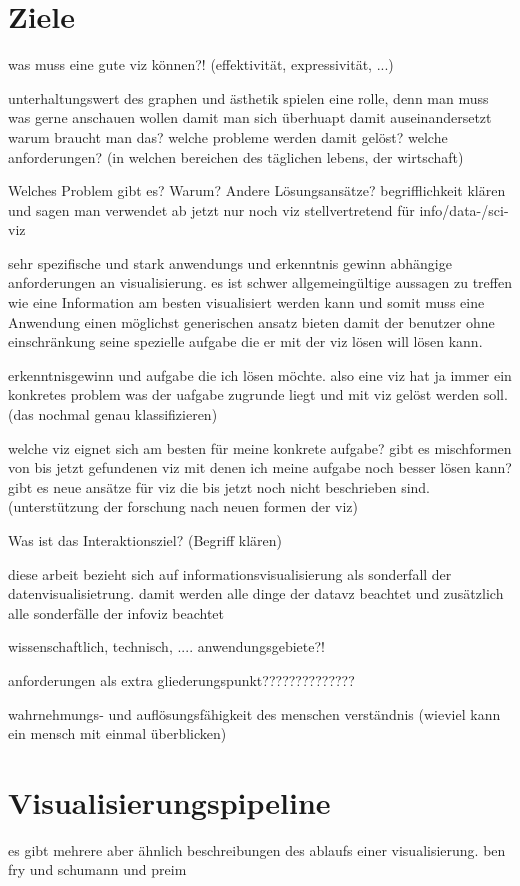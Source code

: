 \documentclass[a4paper, 12pt, DIVcalc, onepage, pdftex, headsepline, footsepline]{scrreprt}
\begin{document}
\section{Ziele}
\label{sec:Ziele}
was muss eine gute viz können?! (effektivität, expressivität, ...)

unterhaltungswert des graphen und ästhetik spielen eine rolle, denn man muss was gerne anschauen wollen damit man sich überhuapt damit auseinandersetzt
warum braucht man das? welche probleme werden damit gelöst?
welche anforderungen? (in welchen bereichen des täglichen lebens, der wirtschaft)

Welches Problem gibt es?
Warum?
Andere Lösungsansätze?
begrifflichkeit klären und sagen man verwendet ab jetzt nur noch viz stellvertretend für info/data-/sci-viz

sehr spezifische und stark anwendungs und erkenntnis gewinn abhängige anforderungen an visualisierung. 
es ist schwer allgemeingültige aussagen zu treffen wie eine Information am besten visualisiert werden kann und somit muss eine Anwendung einen möglichst generischen ansatz bieten damit der benutzer ohne einschränkung seine spezielle aufgabe die er mit der viz lösen will lösen kann.

erkenntnisgewinn und aufgabe die ich lösen möchte. also eine viz hat ja immer ein konkretes problem was der uafgabe zugrunde liegt und mit viz gelöst werden soll. (das nochmal genau klassifizieren)

welche viz eignet sich am besten für meine konkrete aufgabe?
gibt es mischformen von bis jetzt gefundenen viz mit denen ich meine aufgabe noch besser lösen kann?
gibt es neue ansätze für viz die bis jetzt noch nicht beschrieben sind. (unterstützung der forschung nach neuen formen der viz)

Was ist das Interaktionsziel? (Begriff klären)

diese arbeit bezieht sich auf informationsvisualisierung als sonderfall der datenvisualisietrung. damit werden alle dinge der datavz beachtet und zusätzlich alle sonderfälle der infoviz beachtet

wissenschaftlich, technisch, .... anwendungsgebiete?!

anforderungen als extra gliederungspunkt??????????????

wahrnehmungs- und auflösungsfähigkeit des menschen
verständnis (wieviel kann ein mensch mit einmal überblicken)

\section{Visualisierungspipeline}
\label{sec:Pipeline}
es gibt mehrere aber ähnlich beschreibungen des ablaufs einer visualisierung.
ben fry und schumann  und preim
\end{document}
